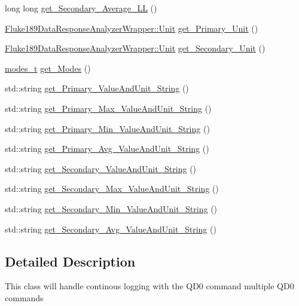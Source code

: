 \begin{DoxyCompactItemize}
\item 
long long \hyperlink{classFluke_1_1Fluke189QD0Logging_a1f33bcc2d2342018f0a1ef5b4ec3caa0}{get\_\-Secondary\_\-Average\_\-LL} ()
\item 
\hyperlink{classFluke_1_1Fluke189DataResponseAnalyzerWrapper_ab8e5f2306e4d2ad3d741d273793aaed1}{Fluke189DataResponseAnalyzerWrapper::Unit} \hyperlink{classFluke_1_1Fluke189QD0Logging_a864f0f60f6995d5d035163caf0651565}{get\_\-Primary\_\-Unit} ()
\item 
\hyperlink{classFluke_1_1Fluke189DataResponseAnalyzerWrapper_ab8e5f2306e4d2ad3d741d273793aaed1}{Fluke189DataResponseAnalyzerWrapper::Unit} \hyperlink{classFluke_1_1Fluke189QD0Logging_a7d50361ed373ebaf4bf9cd7bf101f93d}{get\_\-Secondary\_\-Unit} ()
\item 
\hyperlink{structFluke_1_1Fluke189QD0Logging_1_1modes__t}{modes\_\-t} \hyperlink{classFluke_1_1Fluke189QD0Logging_a334633daaf140e8d49655e65ecd382e3}{get\_\-Modes} ()
\item 
std::string \hyperlink{classFluke_1_1Fluke189QD0Logging_a1ab6475394ca111e1afcd044d4f278e7}{get\_\-Primary\_\-ValueAndUnit\_\-String} ()
\item 
std::string \hyperlink{classFluke_1_1Fluke189QD0Logging_ad4b792edac72623811391b8973a7feb9}{get\_\-Primary\_\-Max\_\-ValueAndUnit\_\-String} ()
\item 
std::string \hyperlink{classFluke_1_1Fluke189QD0Logging_ab127d5f48ca12170a48cbaacf2b9f96f}{get\_\-Primary\_\-Min\_\-ValueAndUnit\_\-String} ()
\item 
std::string \hyperlink{classFluke_1_1Fluke189QD0Logging_a2df10d36428d5950a20d5eb9b24615c0}{get\_\-Primary\_\-Avg\_\-ValueAndUnit\_\-String} ()
\item 
std::string \hyperlink{classFluke_1_1Fluke189QD0Logging_a5e36bbcb7bc5c45ffaf099af76c46d7e}{get\_\-Secondary\_\-ValueAndUnit\_\-String} ()
\item 
std::string \hyperlink{classFluke_1_1Fluke189QD0Logging_a57918fff03c4c54763b13ee3da0e6ea2}{get\_\-Secondary\_\-Max\_\-ValueAndUnit\_\-String} ()
\item 
std::string \hyperlink{classFluke_1_1Fluke189QD0Logging_a592eb82801467a79a5bdd133bb5e5840}{get\_\-Secondary\_\-Min\_\-ValueAndUnit\_\-String} ()
\item 
std::string \hyperlink{classFluke_1_1Fluke189QD0Logging_a34ee9e63eb8b4b44e76fcde20856898c}{get\_\-Secondary\_\-Avg\_\-ValueAndUnit\_\-String} ()
\end{DoxyCompactItemize}


\subsection{Detailed Description}
This class will handle continous logging with the QD0 command multiple QD0 commands 

